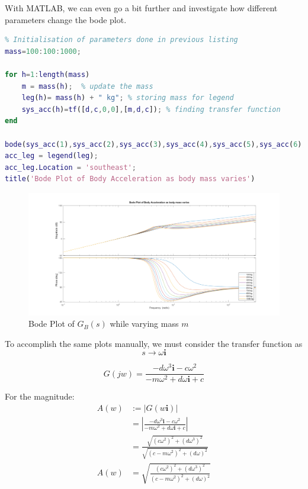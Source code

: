 \documentclass{article}
\begin{document}
\vspace{1em}

With MATLAB, we can even go a bit further and investigate how different parameters change the bode plot. 

\begin{lstlisting}[language=Matlab, caption={Script to Plot Bode Diagram Varying Mass}]
%% Variation of Mass
% Initialisation of parameters done in previous listing
mass=100:100:1000;

for h=1:length(mass)
    m = mass(h);  % update the mass
    leg(h)= mass(h) + " kg"; % storing mass for legend
    sys_acc(h)=tf([d,c,0,0],[m,d,c]); % finding transfer function
end

bode(sys_acc(1),sys_acc(2),sys_acc(3),sys_acc(4),sys_acc(5),sys_acc(6),sys_acc(7),sys_acc(8),sys_acc(9),sys_acc(10),freq)
acc_leg = legend(leg);
acc_leg.Location = 'southeast';
title('Bode Plot of Body Acceleration as body mass varies')
\end{lstlisting}

\begin{figure} [H]
    \centering
    \includegraphics[width=1\linewidth]{BodePlot_SingleMass_Acc_MassVar.png}
    \caption{Bode Plot of $G_B(s)$ while varying mass $m$}
    \label{fig:BodePlotMassVar}
\end{figure}

To accomplish the same plots manually, we must consider the transfer function as $$s\rightarrow \omega\mathbf{i}$$

\begin{equation}
    G(jw)=\frac{-d\omega^{3}\mathbf{i}-c\omega^{2}}{-m\omega^{2}+d\omega \mathbf{i}+c}
\end{equation}

For the magnitude: 
\begin{align*}
A(w) &:=|G(w\mathbf{i})| \\
 &=\left|\frac{-d\omega^{3}\mathbf{i}-c\omega^{2}}{-m\omega^{2}+d\omega \mathbf{i}+c}\right| \\
 &=\frac{\sqrt{(c\omega^2)^{2}+(d\omega^{3})^{2}}}{\sqrt{(c-m\omega^{2})^{2}+(d\omega)^{2}}} \\
A(w) &=\sqrt{\frac{(c\omega^{2})^{2}+(d\omega^{3})^{2}}{(c-m\omega^{2})^{2}+(d\omega)^{2}}}
\end{align*}
\end{document}
